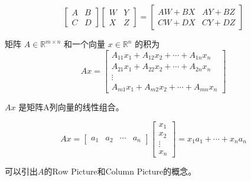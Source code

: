 \begin{definition}[分块矩阵乘法]
    \begin{equation} \left[\begin{array}{ll}A & B \\ {C} & D\end{array}\right]\left[\begin{array}{ll}W & Y \\ X & Z\end{array}\right]=\left[\begin{array}{ll}A W+B X & A Y+B Z \\ C W+D X & C Y+D Z\end{array}\right] \end{equation}
\end{definition}

\begin{definition}[矩阵-向量乘积 $Ax$]
    矩阵 $ A \in \mathbb{R}^{m \times n} $ 和一个向量 $ x \in \mathbb{R}^{n} $ 的积为
\begin{equation}
A x=\left[\begin{array}{c}
A_{11} x_{1}+A_{12} x_{2}+\cdots+A_{1 n} x_{n} \\
A_{21} x_{1}+A_{22} x_{2}+\cdots+A_{2 n} x_{n} \\
\vdots \\
A_{m 1} x_{1}+A_{m 2} x_{2}+\cdots+A_{m n} x_{n}
\end{array}\right]
\end{equation}
\end{definition}

\begin{corollary}
    $ {A} x $ 是矩阵A列向量的线性组合。

\begin{equation}
A x=\left[\begin{array}{llll}
a_{1} & a_{2} & \cdots & a_{n}
\end{array}\right]\left[\begin{array}{c}
x_{1} \\
x_{2} \\
\vdots \\
x_{n}
\end{array}\right]=x_{1} a_{1}+\cdots+x_{n} a_{n}
\end{equation}
\end{corollary}

可以引出$A$的Row Picture和Column Picture的概念。

